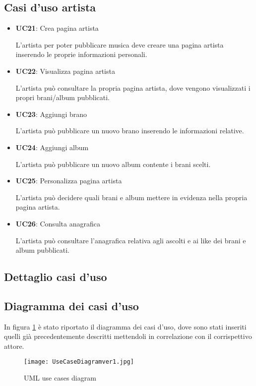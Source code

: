 \subsection{Casi d'uso artista}
\begin{itemize}
      \item \textbf{UC21}: Crea pagina artista 
      
      L'artista per poter pubblicare musica deve
            creare una pagina artista inserendo le proprie informazioni personali.
      \item  \textbf{UC22}: Visualizza pagina artista 
      
      L'artista può consultare la propria
            pagina artista, dove vengono visualizzati i propri brani/album pubblicati.
      \item  \textbf{UC23}: Aggiungi brano 
      
      L'artista può pubblicare un nuovo brano
            inserendo le informazioni relative.
      \item  \textbf{UC24}: Aggiungi album 
      
      L'artista può pubblicare un nuovo album contente
            i brani scelti.
      \item  \textbf{UC25}: Personalizza pagina artista 
      
      L'artista può decidere quali brani
            e album mettere in evidenza nella propria pagina artista.
      \item  \textbf{UC26}: Consulta anagrafica 
      
      L'artista può consultare l'anagrafica
            relativa agli ascolti e ai like dei brani e album pubblicati.

\end{itemize}

\subsection{Dettaglio casi d'uso}

\newpage
\subsection{Diagramma dei casi d'uso}

In figura \ref{fig-uml-use-cases} è stato riportato il diagramma dei casi d'uso, dove sono stati inseriti quelli
già precedentemente descritti mettendoli in correlazione con il corrispettivo attore.

\begin{figure}[H]
      \centering
      \texttt{[image: UseCaseDiagramver1.jpg]}
      \caption{UML use cases diagram}
      \label{fig-uml-use-cases}
\end{figure}


